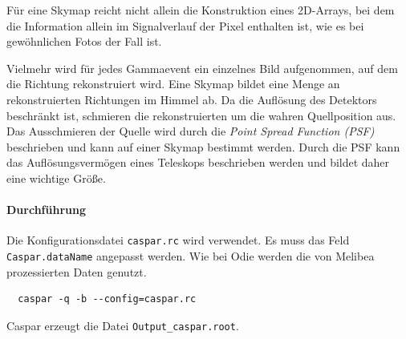 Für eine Skymap reicht nicht allein die Konstruktion eines 2D-Arrays,
bei dem die Information allein im Signalverlauf der Pixel enthalten ist,
wie es bei gewöhnlichen Fotos der Fall ist.

Vielmehr wird für jedes Gammaevent ein einzelnes Bild aufgenommen,
auf dem die Richtung rekonstruiert wird.
Eine Skymap bildet eine Menge an rekonstruierten Richtungen im Himmel ab.
Da die Auflösung des Detektors beschränkt ist,
schmieren die rekonstruierten um die wahren Quellposition aus.
Das Ausschmieren der Quelle wird durch die \textit{Point Spread Function (PSF)}
beschrieben
und kann auf einer Skymap bestimmt werden.
Durch die PSF kann das Auflösungsvermögen eines Teleskops
beschrieben werden und bildet daher eine wichtige Größe.

\paragraph{Durchführung}%

Die Konfigurationsdatei \texttt{caspar.rc} wird verwendet.
Es muss das Feld \texttt{Caspar.dataName} angepasst werden.
Wie bei Odie werden die von Melibea prozessierten Daten genutzt.

\begin{lstlisting}
  caspar -q -b --config=caspar.rc
\end{lstlisting}

Caspar erzeugt die Datei \texttt{Output\_caspar.root}.
